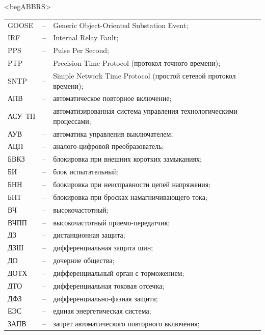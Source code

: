 \color{unidarkgreen}\section*{}
{\color{white}\fontsize{0.1pt}{0.1pt}\selectfont<begABBRS>}
\color{black}
\begin{longtable}{>{\raggedright\arraybackslash}m{2cm}>{\raggedright\arraybackslash}m{0.5cm}>{\raggedright\arraybackslash}m{20cm}}
\endfirsthead\endhead\endfoot\endlastfoot
GOOSE & -- & Generic Object-Oriented Substation Event; \\
IRF & -- & Internal Relay Fault; \\
PPS & -- & Pulse Per Second; \\
PTP & -- & Precision Time Protocol (протокол точного времени); \\
SNTP & -- & Simple Network Time Protocol (простой сетевой протокол времени); \\
АПВ & -- & автоматическое повторное включение; \\
АСУ~ТП & -- & автоматизированная система управления технологическими процессами; \\
АУВ & -- & автоматика управления выключателем; \\
АЦП & -- & аналого-цифровой преобразователь; \\
БВКЗ & -- & блокировка при внешних коротких замыканиях; \\
БИ & -- & блок испытательный; \\
БНН & -- & блокировка при неисправности цепей напряжения; \\
БНТ & -- & блокировка при бросках намагничивающего тока; \\
ВЧ & -- & высокочастотный; \\
ВЧПП & -- & высокочастотный приемо-передатчик; \\
ДЗ & -- & дистанционная защита; \\
ДЗШ & -- & дифференциальная защита шин; \\
ДО & -- & дочерние общества; \\
ДОТХ & -- & дифференциальный орган с торможением; \\
ДТО & -- & дифференциальная токовая отсечка; \\
ДФЗ & -- & дифференциально-фазная защита; \\
ЕЭС & -- & единая энергетическая система; \\
ЗАПВ & -- & запрет автоматического повторного включения; \\

\end{longtable}
